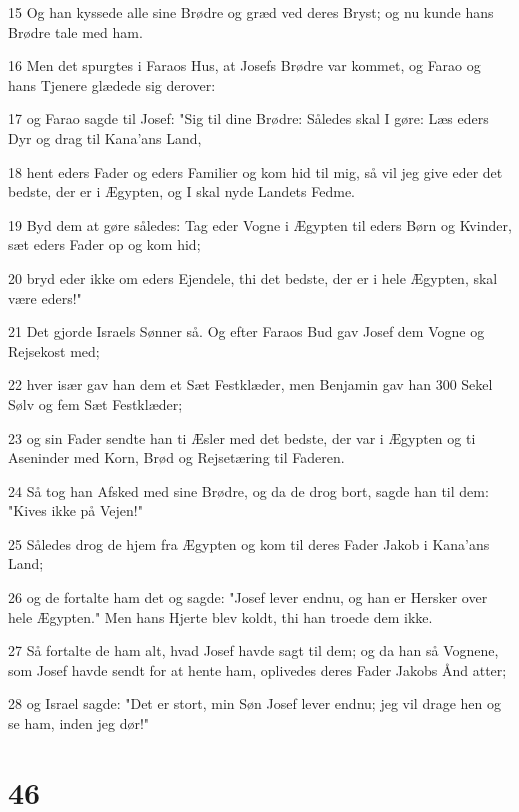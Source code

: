 \par 15 Og han kyssede alle sine Brødre og græd ved deres Bryst; og nu kunde hans Brødre tale med ham.
\par 16 Men det spurgtes i Faraos Hus, at Josefs Brødre var kommet, og Farao og hans Tjenere glædede sig derover:
\par 17 og Farao sagde til Josef: "Sig til dine Brødre: Således skal I gøre: Læs eders Dyr og drag til Kana'ans Land,
\par 18 hent eders Fader og eders Familier og kom hid til mig, så vil jeg give eder det bedste, der er i Ægypten, og I skal nyde Landets Fedme.
\par 19 Byd dem at gøre således: Tag eder Vogne i Ægypten til eders Børn og Kvinder, sæt eders Fader op og kom hid;
\par 20 bryd eder ikke om eders Ejendele, thi det bedste, der er i hele Ægypten, skal være eders!"
\par 21 Det gjorde Israels Sønner så. Og efter Faraos Bud gav Josef dem Vogne og Rejsekost med;
\par 22 hver især gav han dem et Sæt Festklæder, men Benjamin gav han 300 Sekel Sølv og fem Sæt Festklæder;
\par 23 og sin Fader sendte han ti Æsler med det bedste, der var i Ægypten og ti Aseninder med Korn, Brød og Rejsetæring til Faderen.
\par 24 Så tog han Afsked med sine Brødre, og da de drog bort, sagde han til dem: "Kives ikke på Vejen!"
\par 25 Således drog de hjem fra Ægypten og kom til deres Fader Jakob i Kana'ans Land;
\par 26 og de fortalte ham det og sagde: "Josef lever endnu, og han er Hersker over hele Ægypten." Men hans Hjerte blev koldt, thi han troede dem ikke.
\par 27 Så fortalte de ham alt, hvad Josef havde sagt til dem; og da han så Vognene, som Josef havde sendt for at hente ham, oplivedes deres Fader Jakobs Ånd atter;
\par 28 og Israel sagde: "Det er stort, min Søn Josef lever endnu; jeg vil drage hen og se ham, inden jeg dør!"

\chapter{46}

